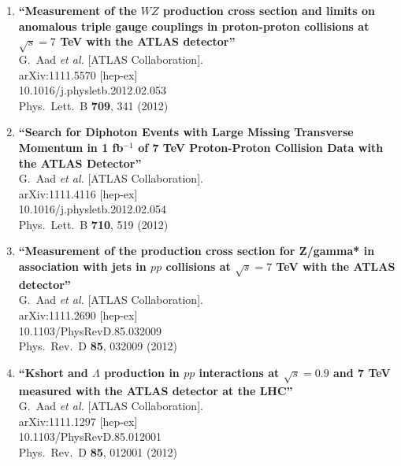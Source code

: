 \documentclass{article}
\begin{document}
\begin{enumerate}
\item%
{\bf ``Measurement of the $WZ$ production cross section and limits on anomalous triple gauge couplings in proton-proton collisions at $\sqrt{s}=7$ TeV with the ATLAS detector''}
  \\{}G.~Aad {\it et al.}  [ATLAS Collaboration].
  \\{}arXiv:1111.5570 [hep-ex]
    \\{}10.1016/j.physletb.2012.02.053
\\{}Phys.\ Lett.\ B {\bf 709}, 341 (2012) %


\item%
{\bf ``Search for Diphoton Events with Large Missing Transverse Momentum in 1 fb$^{-1}$ of 7 TeV Proton-Proton Collision Data with the ATLAS Detector''}
  \\{}G.~Aad {\it et al.}  [ATLAS Collaboration].
  \\{}arXiv:1111.4116 [hep-ex]
    \\{}10.1016/j.physletb.2012.02.054
\\{}Phys.\ Lett.\ B {\bf 710}, 519 (2012) %


\item%
{\bf ``Measurement of the production cross section for Z/gamma* in association with jets in $pp$ collisions at $\sqrt{s}=7$ TeV with the ATLAS detector''}
  \\{}G.~Aad {\it et al.}  [ATLAS Collaboration].
  \\{}arXiv:1111.2690 [hep-ex]
    \\{}10.1103/PhysRevD.85.032009
\\{}Phys.\ Rev.\ D {\bf 85}, 032009 (2012) %


\item%
{\bf ``Kshort and $\Lambda$ production in $pp$ interactions at $\sqrt{s}=0.9$ and 7 TeV measured with the ATLAS detector at the LHC''}
  \\{}G.~Aad {\it et al.}  [ATLAS Collaboration].
  \\{}arXiv:1111.1297 [hep-ex]
    \\{}10.1103/PhysRevD.85.012001
\\{}Phys.\ Rev.\ D {\bf 85}, 012001 (2012) %



\end{enumerate}
\end{document}
